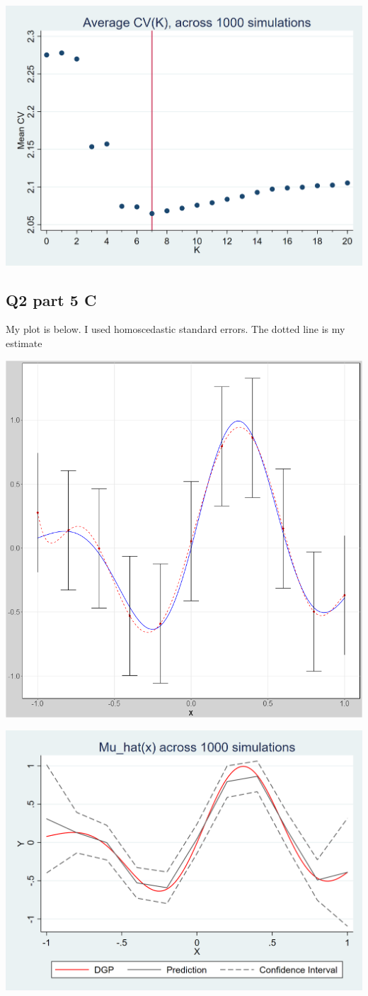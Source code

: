 \documentclass[11pt]{article}
\begin{document}
\begin{center}
	\includegraphics[width=.6\linewidth]{stata_plot_2_5_b.png}
	
\end{center}





\subsection{ Q2 part 5 C}
My plot is below. I used homoscedastic standard errors.  The dotted line is my estimate
\begin{center}
	\includegraphics[width=.6\linewidth]{plot_2_5_c.png}
	
\end{center}
\begin{center}
	\includegraphics[width=.6\linewidth]{stata_plot_2_5_c.png}
	
\end{center}
\end{document}
